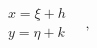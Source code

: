 \documentclass[preview]{standalone}
\begin{document}
\begin{align*}
\begin{array}{l}x=\xi+h\\y=\eta+k\end{array}\quad,\quad
\end{align*}
\end{document}
